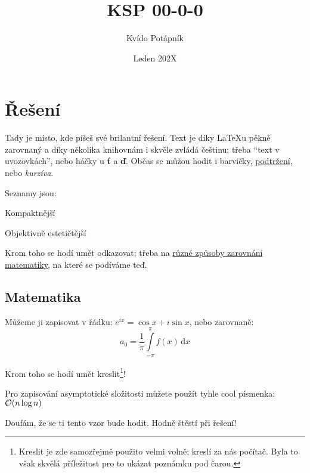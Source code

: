 \documentclass{ksp}
\title{KSP 00-0-0}
\author{Kvído Potápník}
\date{Leden 202X}
\begin{document}
\maketitle

\section*{Řešení}

Tady je místo, kde píšeš své brilantní řešení. Text je díky \LaTeX{u} pěkně zarovnaný a díky několika knihovnám i skvěle zvládá češtinu; třeba \enquote{text v uvozovkách}, nebo háčky u \textbf{ť} a \textbf{ď}. Občas se můžou hodit i {\color{red} barvičky}, \underline{podtržení}, nebo \emph{kurzíva}.

Seznamy jsou:

\begin{compactitem}
    \item Kompaktnější
    \item Objektivně estetičtější
\end{compactitem}

Krom toho se hodí umět odkazovat; třeba na \href{https://en.wikibooks.org/wiki/LaTeX/Advanced_Mathematics#Other_environments}{různé způsoby zarovnání matematiky}, na které se podíváme teď. 

\subsection*{Matematika}

Můžeme ji zapisovat v řádku: $e^{ix} = \cos{x} + i \sin{x}$, nebo zarovnaně:
%
$$
    a_0=\frac{1}{\pi}\int\limits_{-\pi}^{\pi}f(x)\,\mathrm{d}x
$$

Krom toho se hodí umět kreslit\footnote{Kreslit je zde samozřejmě použito velmi volně; kreslí za nás počítač. Byla to však skvělá příležitost pro to ukázat poznámku pod čarou.}!

\hfill


Pro zapisování asymptotické složitosti můžete použít tyhle cool písmenka: $\mathcal{O}(n \log n)$

\begin{center}
    {\large Doufám, že se ti tento vzor bude hodit. Hodně štěstí při řešení!}
\end{center}
\end{document}
